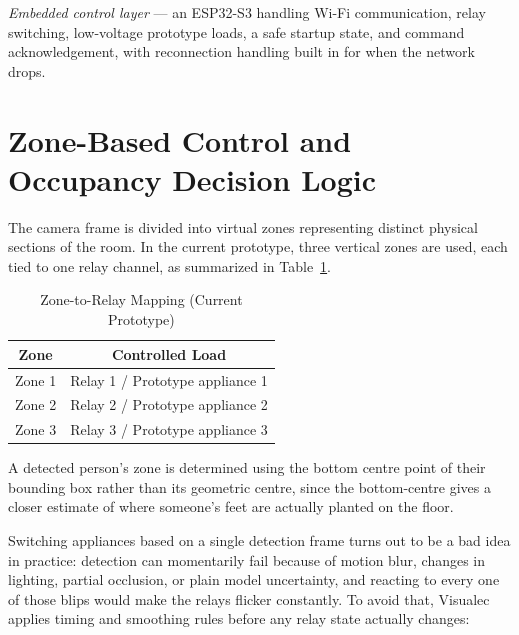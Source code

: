 \documentclass[conference]{IEEEtran}
\begin{document}
\textit{Embedded control layer} --- an ESP32-S3 handling Wi-Fi communication, relay switching, low-voltage prototype loads, a safe startup state, and command acknowledgement, with reconnection handling built in for when the network drops.

\section{Zone-Based Control and Occupancy Decision Logic}
The camera frame is divided into virtual zones representing distinct physical sections of the room. In the current prototype, three vertical zones are used, each tied to one relay channel, as summarized in Table~\ref{tab:zones}.

\begin{table}[htbp]
\caption{Zone-to-Relay Mapping (Current Prototype)}
\begin{center}
\begin{tabular}{|c|c|}
\hline
\textbf{Zone} & \textbf{Controlled Load} \\
\hline
Zone 1 & Relay 1 / Prototype appliance 1 \\
\hline
Zone 2 & Relay 2 / Prototype appliance 2 \\
\hline
Zone 3 & Relay 3 / Prototype appliance 3 \\
\hline
\end{tabular}
\label{tab:zones}
\end{center}
\end{table}

A detected person's zone is determined using the bottom centre point of their bounding box rather than its geometric centre, since the bottom-centre gives a closer estimate of where someone's feet are actually planted on the floor.

Switching appliances based on a single detection frame turns out to be a bad idea in practice: detection can momentarily fail because of motion blur, changes in lighting, partial occlusion, or plain model uncertainty, and reacting to every one of those blips would make the relays flicker constantly. To avoid that, Visualec applies timing and smoothing rules before any relay state actually changes:
\end{document}
